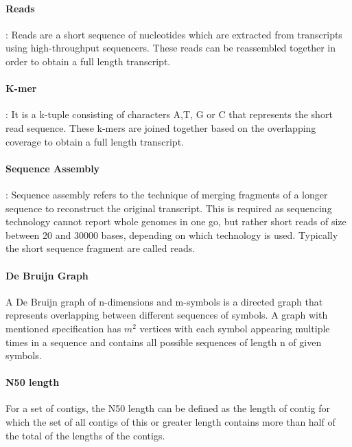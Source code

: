 \label{key}\documentclass[bachinf, english ,zihtitle,final,hyperref,utf8]{zihpub}
\begin{document}
\paragraph{Reads}: 
Reads are a short sequence of nucleotides which are extracted from transcripts using high-throughput sequencers. These reads can be reassembled together in order to obtain a full length transcript.
\paragraph{K-mer}: It is a k-tuple consisting of characters A,T, G or C that represents the short read sequence. These k-mers are joined together based on the overlapping coverage to obtain a full length transcript.
\paragraph{Sequence Assembly}: Sequence assembly refers to the technique of merging fragments of a longer sequence to reconstruct the original transcript. This is required as sequencing technology cannot report whole genomes in one go, but rather short reads of size between 20 and 30000 bases, depending on which technology is used. Typically the short sequence fragment are called reads.
\paragraph{De Bruijn Graph} A De Bruijn graph of n-dimensions and m-symbols is a directed graph that represents overlapping between different sequences of symbols. A graph with mentioned specification has $m^{2}$ vertices with each symbol appearing multiple times in a sequence and contains all possible sequences of length n of given symbols.
\paragraph{N50 length} For a set of contigs, the N50 length can be defined as the length of contig for which the set of all contigs of this or greater length contains more than half of the total of the lengths of the contigs.
\end{document}
